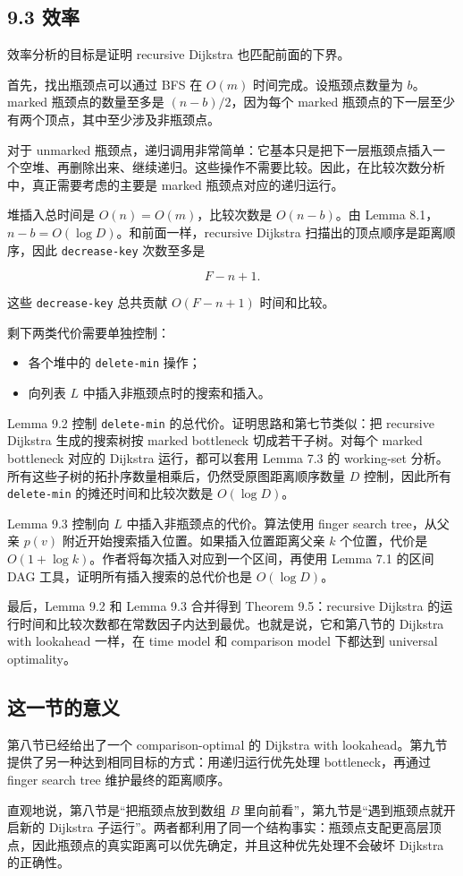 \documentclass[UTF8]{ctexart}
\begin{document}
\subsection*{9.3 效率}

效率分析的目标是证明 recursive Dijkstra 也匹配前面的下界。

首先，找出瓶颈点可以通过 BFS 在 \(O(m)\) 时间完成。设瓶颈点数量为 \(b\)。marked 瓶颈点的数量至多是 \((n-b)/2\)，因为每个 marked 瓶颈点的下一层至少有两个顶点，其中至少涉及非瓶颈点。

对于 unmarked 瓶颈点，递归调用非常简单：它基本只是把下一层瓶颈点插入一个空堆、再删除出来、继续递归。这些操作不需要比较。因此，在比较次数分析中，真正需要考虑的主要是 marked 瓶颈点对应的递归运行。

堆插入总时间是 \(O(n)=O(m)\)，比较次数是 \(O(n-b)\)。由 Lemma 8.1，\(n-b=O(\log D)\)。和前面一样，recursive Dijkstra 扫描出的顶点顺序是距离顺序，因此 \texttt{decrease-key} 次数至多是

\[
F-n+1.
\]

这些 \texttt{decrease-key} 总共贡献 \(O(F-n+1)\) 时间和比较。

剩下两类代价需要单独控制：

\begin{itemize}
  \item 各个堆中的 \texttt{delete-min} 操作；
  \item 向列表 \(L\) 中插入非瓶颈点时的搜索和插入。
\end{itemize}

Lemma 9.2 控制 \texttt{delete-min} 的总代价。证明思路和第七节类似：把 recursive Dijkstra 生成的搜索树按 marked bottleneck 切成若干子树。对每个 marked bottleneck 对应的 Dijkstra 运行，都可以套用 Lemma 7.3 的 working-set 分析。所有这些子树的拓扑序数量相乘后，仍然受原图距离顺序数量 \(D\) 控制，因此所有 \texttt{delete-min} 的摊还时间和比较次数是 \(O(\log D)\)。

Lemma 9.3 控制向 \(L\) 中插入非瓶颈点的代价。算法使用 finger search tree，从父亲 \(p(v)\) 附近开始搜索插入位置。如果插入位置距离父亲 \(k\) 个位置，代价是 \(O(1+\log k)\)。作者将每次插入对应到一个区间，再使用 Lemma 7.1 的区间 DAG 工具，证明所有插入搜索的总代价也是 \(O(\log D)\)。

最后，Lemma 9.2 和 Lemma 9.3 合并得到 Theorem 9.5：recursive Dijkstra 的运行时间和比较次数都在常数因子内达到最优。也就是说，它和第八节的 Dijkstra with lookahead 一样，在 time model 和 comparison model 下都达到 universal optimality。

\subsection*{这一节的意义}

第八节已经给出了一个 comparison-optimal 的 Dijkstra with lookahead。第九节提供了另一种达到相同目标的方式：用递归运行优先处理 bottleneck，再通过 finger search tree 维护最终的距离顺序。

直观地说，第八节是“把瓶颈点放到数组 \(B\) 里向前看”，第九节是“遇到瓶颈点就开启新的 Dijkstra 子运行”。两者都利用了同一个结构事实：瓶颈点支配更高层顶点，因此瓶颈点的真实距离可以优先确定，并且这种优先处理不会破坏 Dijkstra 的正确性。
\end{document}
